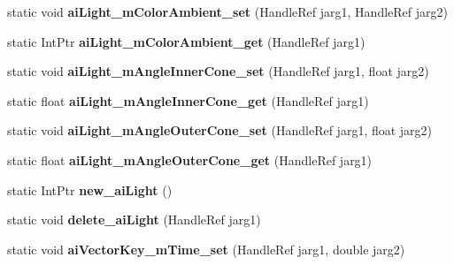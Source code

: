\begin{DoxyCompactItemize}
\item 
\hypertarget{class_assimp_p_i_n_v_o_k_e_a1dc4b47876c7d20cd5874ce1be89fdc8}{static void {\bfseries ai\+Light\+\_\+m\+Color\+Ambient\+\_\+set} (Handle\+Ref jarg1, Handle\+Ref jarg2)}\label{class_assimp_p_i_n_v_o_k_e_a1dc4b47876c7d20cd5874ce1be89fdc8}

\item 
\hypertarget{class_assimp_p_i_n_v_o_k_e_ae68f73ecb6119106608b4dba8ac3be85}{static Int\+Ptr {\bfseries ai\+Light\+\_\+m\+Color\+Ambient\+\_\+get} (Handle\+Ref jarg1)}\label{class_assimp_p_i_n_v_o_k_e_ae68f73ecb6119106608b4dba8ac3be85}

\item 
\hypertarget{class_assimp_p_i_n_v_o_k_e_ad3c9839bc763576cb1474afc1665d079}{static void {\bfseries ai\+Light\+\_\+m\+Angle\+Inner\+Cone\+\_\+set} (Handle\+Ref jarg1, float jarg2)}\label{class_assimp_p_i_n_v_o_k_e_ad3c9839bc763576cb1474afc1665d079}

\item 
\hypertarget{class_assimp_p_i_n_v_o_k_e_ab253c89d145ea47ee54eafd547de9472}{static float {\bfseries ai\+Light\+\_\+m\+Angle\+Inner\+Cone\+\_\+get} (Handle\+Ref jarg1)}\label{class_assimp_p_i_n_v_o_k_e_ab253c89d145ea47ee54eafd547de9472}

\item 
\hypertarget{class_assimp_p_i_n_v_o_k_e_a08434926dd6e62bc8ed0eeab24e10f6f}{static void {\bfseries ai\+Light\+\_\+m\+Angle\+Outer\+Cone\+\_\+set} (Handle\+Ref jarg1, float jarg2)}\label{class_assimp_p_i_n_v_o_k_e_a08434926dd6e62bc8ed0eeab24e10f6f}

\item 
\hypertarget{class_assimp_p_i_n_v_o_k_e_a57cf152808bfdd828138de791f3f5d57}{static float {\bfseries ai\+Light\+\_\+m\+Angle\+Outer\+Cone\+\_\+get} (Handle\+Ref jarg1)}\label{class_assimp_p_i_n_v_o_k_e_a57cf152808bfdd828138de791f3f5d57}

\item 
\hypertarget{class_assimp_p_i_n_v_o_k_e_ac632da9363579574a92665799c3f036b}{static Int\+Ptr {\bfseries new\+\_\+ai\+Light} ()}\label{class_assimp_p_i_n_v_o_k_e_ac632da9363579574a92665799c3f036b}

\item 
\hypertarget{class_assimp_p_i_n_v_o_k_e_a3bb523ae044fea5c016d8faf0f8952d2}{static void {\bfseries delete\+\_\+ai\+Light} (Handle\+Ref jarg1)}\label{class_assimp_p_i_n_v_o_k_e_a3bb523ae044fea5c016d8faf0f8952d2}

\item 
\hypertarget{class_assimp_p_i_n_v_o_k_e_a04b682722c4b122f9ad7690988f9c99c}{static void {\bfseries ai\+Vector\+Key\+\_\+m\+Time\+\_\+set} (Handle\+Ref jarg1, double jarg2)}\label{class_assimp_p_i_n_v_o_k_e_a04b682722c4b122f9ad7690988f9c99c}


\end{DoxyCompactItemize}
